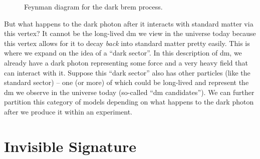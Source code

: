 \begin{figure}
  \centering
  \caption{
    Feynman diagram for the dark brem process.
  }
  \label{fig:dark-brem-feynman}
\end{figure}

But what happens to the dark photon after it interacts with standard matter via this vertex? It
cannot be the long-lived \ac{dm} we view in the universe today because this vertex allows for it
to decay \emph{back} into standard matter pretty easily. This is where we expand on the idea of a
``dark sector''. In this description of \ac{dm}, we already have a dark photon representing some
force and a very heavy field that can interact with it. Suppose this ``dark sector'' also has other
particles (like the standard sector) -- one (or more) of which could be long-lived and represent
the \ac{dm} we observe in the universe today (so-called ``\ac{dm} candidates''). We can further
partition this category of models depending on what happens to the dark photon after we
produce it within an experiment.

\section{Invisible Signature}

